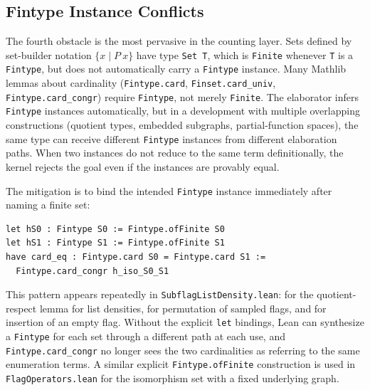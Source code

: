 \documentclass{article}
\newcommand{\lean}[1]{\texttt{#1}}
\begin{document}
\subsection{Fintype Instance Conflicts}
\label{sec:fintype}

The fourth obstacle is the most pervasive in the counting layer.  Sets defined
by set-builder notation $\{x \mid P\ x\}$ have type \lean{Set T}, which is
\lean{Finite} whenever \lean{T} is a \lean{Fintype}, but does not
automatically carry a \lean{Fintype} instance.  Many Mathlib lemmas about
cardinality (\lean{Fintype.card}, \lean{Finset.card\_univ},
\lean{Fintype.card\_congr}) require \lean{Fintype}, not merely \lean{Finite}.
The elaborator infers \lean{Fintype} instances automatically, but in a
development with multiple overlapping constructions (quotient types, embedded
subgraphs, partial-function spaces), the same type can receive different
\lean{Fintype} instances from different elaboration paths.  When two
instances do not reduce to the same term definitionally, the kernel rejects
the goal even if the instances are provably equal.

The mitigation is to bind the intended \lean{Fintype} instance immediately
after naming a finite set:
\begin{lstlisting}
let hS0 : Fintype S0 := Fintype.ofFinite S0
let hS1 : Fintype S1 := Fintype.ofFinite S1
have card_eq : Fintype.card S0 = Fintype.card S1 :=
  Fintype.card_congr h_iso_S0_S1
\end{lstlisting}
This pattern appears repeatedly in \lean{SubflagListDensity.lean}: for the
quotient-respect lemma for list densities, for permutation of sampled flags,
and for insertion of an empty flag.  Without the explicit \lean{let} bindings,
Lean can synthesize a \lean{Fintype} for each set through a different path at
each use, and \lean{Fintype.card\_congr} no longer sees the two cardinalities
as referring to the same enumeration terms.  A similar explicit
\lean{Fintype.ofFinite} construction is used in \lean{FlagOperators.lean} for
the isomorphism set with a fixed underlying graph.
\end{document}
